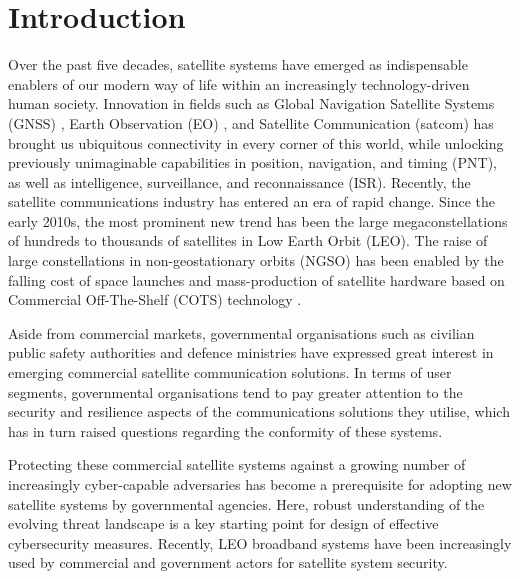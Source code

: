 \documentclass[english, 12pt, a4paper, elec, utf8, a-1b, online]{aaltothesis}
\begin{document}
\cleardoublepage

\section{Introduction}


Over the past five decades, satellite systems have emerged as indispensable enablers of our modern way of life within an increasingly technology-driven human society.
Innovation in fields such as Global Navigation Satellite Systems (GNSS) \cite{oconnor2019economic}, Earth Observation (EO) \cite{lupi2022socioeconomic, tassa2020socioeconomic}, and Satellite Communication (satcom) \cite{euroconsult-space-economy-2023} has brought us ubiquitous connectivity in every corner of this world, while unlocking previously unimaginable capabilities in position, navigation, and timing (PNT), as well as intelligence, surveillance, and reconnaissance (ISR).
Recently, the satellite communications industry has entered an era of rapid change.
Since the early 2010s, the most prominent new trend has been the large megaconstellations of hundreds to thousands of satellites in Low Earth Orbit (LEO).
The raise of large constellations in non-geostationary orbits (NGSO) has been enabled by the falling cost of space launches and mass-production of satellite hardware based on Commercial Off-The-Shelf (COTS) technology \cite{euroconsult-space-economy-2023}.

Aside from commercial markets, governmental organisations such as civilian public safety authorities and defence ministries have expressed great interest in emerging commercial satellite communication solutions.
In terms of user segments, governmental organisations tend to pay greater attention to the security and resilience aspects of the communications solutions they utilise, which has in turn raised questions regarding the conformity of these systems.

Protecting these commercial satellite systems against a growing number of increasingly cyber-capable adversaries has become a prerequisite for adopting new satellite systems by governmental agencies.
Here, robust understanding of the evolving threat landscape is a key starting point for design of effective cybersecurity measures.
Recently, LEO broadband systems have been increasingly used by commercial and government actors for satellite system security.
\end{document}
